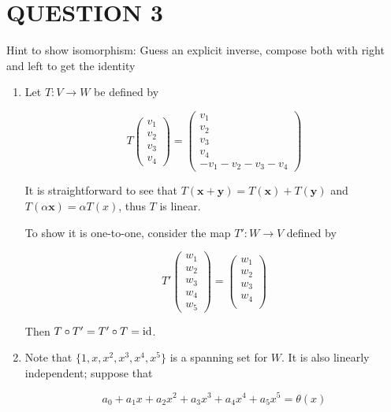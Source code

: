 \documentclass[a4paper]{article}
\begin{document}
	\section{QUESTION 3}
	
	Hint to show isomorphism: Guess an explicit inverse, compose both with right and left to get the identity
	
	\begin{enumerate}[label = (\alph*)]
		\item Let $ T : V \to W $ be defined by
		
		\[ T \begin{pmatrix}
		v_{1}\\
		v_{2}\\
		v_{3}\\
		v_{4}
		\end{pmatrix}  = \begin{pmatrix}
		v_{1}\\
		v_{2}\\
		v_{3}\\
		v_{4} \\
		-v_{1} - v_{2} - v_{3} - v_{4}
		\end{pmatrix}\]
		
		It is straightforward to see that $ T(\mathbf{x} + \mathbf{y}) = T(\mathbf{x}) + T(\mathbf{y}) $ and $ T(\alpha \mathbf{x} ) = \alpha T(x) $, thus $ T $ is linear.	
		
		To show it is one-to-one, consider the map $ T': W \to V $ defined by
		
		\[ T' \begin{pmatrix}
		w_{1}\\
		w_{2}\\
		w_{3}\\
		w_{4}\\
		w_{5}
		\end{pmatrix}  = \begin{pmatrix}
		w_{1}\\
		w_{2}\\
		w_{3}\\
		w_{4} \\
		\end{pmatrix} \]	
		
		Then $ T \circ T' = T' \circ T = \operatorname{id} $.
		
		\item Note that $ \{1,x,x^{2},x^{3},x^{4},x^{5}\} $ is a spanning set for $ W $. It is also linearly independent; suppose that
		
		\[ a_{0} + a_{1} x + a_{2} x^{2} + a_{3}x^{3} + a_{4}x^{4} + a_{5}x^{5} = \theta(x) \]
		

\end{enumerate}
\end{document}
